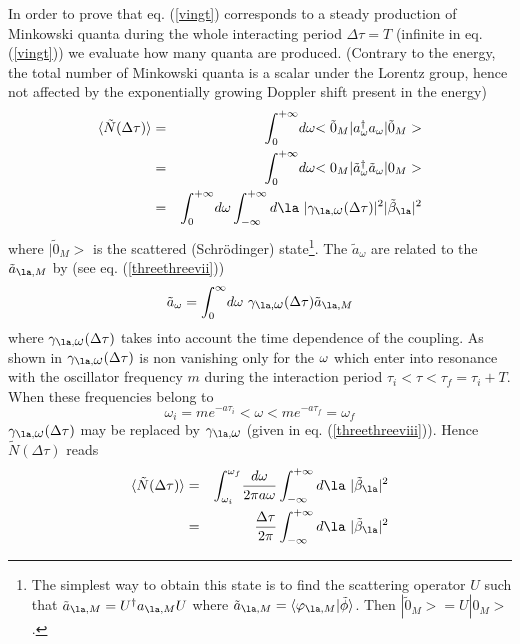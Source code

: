 In order to prove that eq. (\ref{vingt})
corresponds to a steady production of Minkowski quanta
during
the whole interacting period $\Delta \tau =T$ (infinite in eq. (\ref{vingt}))
we evaluate how many quanta are produced.
(Contrary to the energy, the total number of Minkowski quanta
is a scalar under the Lorentz group, hence not affected by the exponentially
growing Doppler shift present in the energy)
 \begin{eqnarray}
\bk{\tilde N( \Delta \tau )}  &=&  \int_{0}^{+\infty}  \! d \omega
\expect{\tilde 0_M}{ a_{ \omega} ^\dagger a_{ \omega}}{ \tilde 0_M}
\nonumber\\ &=&  \int_{0}^{+\infty}  \! d \omega
\expect{0_M}{\tilde  a_{ \omega} ^\dagger
 \tilde a_{ \omega}}{0_M}
\nonumber\\ &=&  \int_{0}^{+\infty}  \! d \omega
 \int_{-\infty}^{+\infty}  d\la\ |  \gamma_{\la,\om}( \Delta \tau )|^2
| \tilde \beta_{\la}|^2
\label{vun}
\end{eqnarray}
where $ |\tilde0_M>$ is the scattered (Schr\"odinger) state\footnote{
The simplest way to obtain this state is to find the scattering operator
$U$ such that $\tilde a_{\la,M}= U ^\dagger a_{\la,M} U$ where
$\tilde a_{\la,M}= \bk{\varphi_{\la,M} \vert \tilde \phi}$. Then $
|\tilde 0_M > =U |0_M >$.}.
The $ \tilde a_{ \omega}$ are related to the $ \tilde a_{\la,M}$
by (see eq. (\ref{threethreevii}))
\begin{equation}
 \tilde a_{ \omega} = \int_0^{\infty}\! d\omega\ \gamma_{\la,\om}
( \Delta \tau )  \tilde a_{\la,M}
\label{vdeux}
\end{equation}
where $\gamma_{\la,\om}( \Delta \tau )$ takes into account the time
dependence of the
coupling. As shown in \cite{pbt}\cite{GO}
 $\gamma_{\la,\om}( \Delta \tau )$ is
non vanishing
only for the $\mbox{$ \omega $}$ which enter into resonance with the oscillator
frequency $m$ during the interaction period
 $ \tau_i <  \tau <
\tau_f = \tau_i + T$. When these frequencies belong to
\begin{equation}
 \omega_i = m e^{-a \tau_i} <  \omega <  m e^{-a \tau_f}= \omega_f
\label{vtrois}
\end{equation}
$ \gamma_{\la,\om}( \Delta \tau )$ may be
replaced by $ \gamma_{\la,\om}$ (given in eq. (\ref{threethreeviii})).
Hence $ \tilde N( \Delta \tau )$ reads
\begin{eqnarray}
\bk{\tilde N( \Delta \tau )} &=&  \int_{ \omega_i}^{ \omega_f}  \!
{d \omega \over 2 \pi a \omega}  \int_{-\infty}^{+\infty}  d\la\ | \tilde
\beta_{\la}|^2
\nonumber\\ &=&  { \Delta \tau \over 2 \pi} \int_{-\infty}^{+\infty}  d\la\ |
\tilde
\beta_{\la}|^2
\label{vquatre}
\end{eqnarray}
